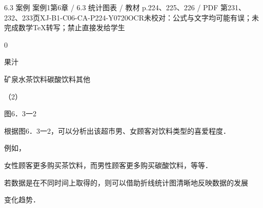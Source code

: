 \begin{bankitem}{6.3 案例 案例1}{第6章 / 6.3 统计图表 / 教材 p.224、225、226 / PDF 第231、232、233页}{XJ-B1-C06-CA-P224-Y0720}{OCR未校对：公式与文字均可能有误；未完成数学TeX转写；禁止直接发给学生}
\begin{ocrdraft}
0
\par
果汁
\par
矿泉水茶饮料碳酸饮料其他
\par
（2）
\par
图6．3一2
\par
根据图6．3一2，可以分析出该超市男、女顾客对饮料类型的喜爱程度．
\par
例如，
\par
女性顾客更多购买茶饮料，而男性顾客更多购买碳酸饮料，等等．
\par
[教材p.226 / PDF第233页]
\par
若数据是在不同时间上取得的，则可以借助折线统计图清晰地反映数据的发展
\par
变化趋势．
\end{ocrdraft}
\end{bankitem}
